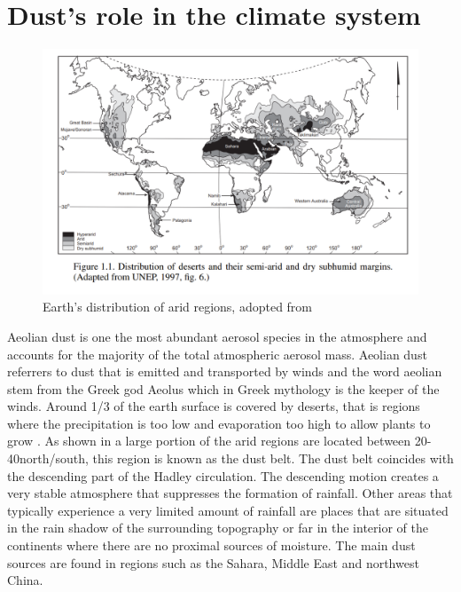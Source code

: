 \section{Dust's role in the climate system}\label{seq:physics_of_dust}
\begin{figure}[htpb]
    \centering
    \includegraphics[width=\textwidth]{texfiles/figs/Desert_distrubtion.PNG}
    \caption{Earth's distribution of arid regions, adopted from \textcite{williams_climate_2014}}
    \label{fig:desert_distrubtion}
\end{figure}
Aeolian dust is one the most abundant aerosol species in the atmosphere and accounts for the majority of the total atmospheric aerosol mass. Aeolian dust referrers to dust that is emitted and transported by winds and the word aeolian stem from the Greek god Aeolus which in Greek mythology is the keeper of the winds. Around 1/3 of the earth surface is covered by deserts, that is regions where the precipitation is too low and evaporation too high to allow plants to grow \parencite{williams_climate_2014}.
As shown in  a large portion of the arid regions are located between 20\degree - 40\degree north/south, this region is known as the dust belt. The dust belt coincides with the descending part of the Hadley circulation. The descending motion creates a very stable atmosphere that suppresses the formation of rainfall. 
Other areas that typically experience a very limited amount of rainfall are places that are situated in the rain shadow of the surrounding topography or far in the interior of the continents where there are no proximal sources of moisture.  
The main dust sources are found in regions such as the Sahara, Middle East and northwest China. 

